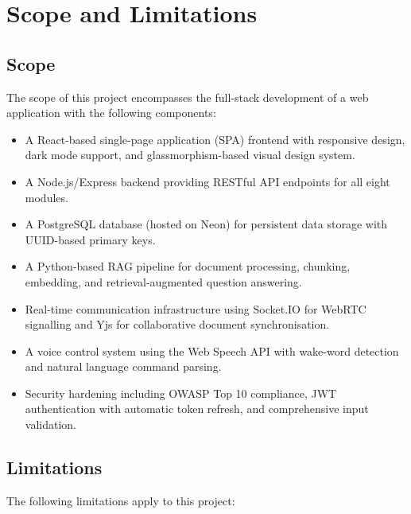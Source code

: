 \documentclass[12pt,a4paper]{report}
\begin{document}
\section{Scope and Limitations}

\subsection{Scope}

The scope of this project encompasses the full-stack development of a web application with the following components:

\begin{itemize}
    \item A React-based single-page application (SPA) frontend with responsive design, dark mode support, and glassmorphism-based visual design system.
    \item A Node.js/Express backend providing RESTful API endpoints for all eight modules.
    \item A PostgreSQL database (hosted on Neon) for persistent data storage with UUID-based primary keys.
    \item A Python-based RAG pipeline for document processing, chunking, embedding, and retrieval-augmented question answering.
    \item Real-time communication infrastructure using Socket.IO for WebRTC signalling and Yjs for collaborative document synchronisation.
    \item A voice control system using the Web Speech API with wake-word detection and natural language command parsing.
    \item Security hardening including OWASP Top 10 compliance, JWT authentication with automatic token refresh, and comprehensive input validation.
\end{itemize}

\subsection{Limitations}

The following limitations apply to this project:
\end{document}

